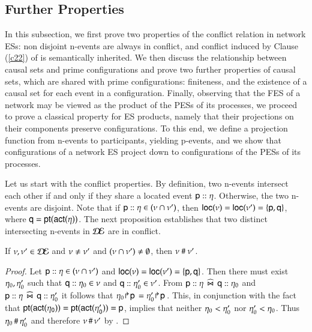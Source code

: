 

\subsection{Further Properties}

In this subsection, we first prove two properties of the
conflict relation in network ESs: non disjoint n-events are always in
conflict, and conflict induced by Clause (\ref{c22}) of
 is semantically inherited.  
 We then discuss the relationship between causal sets and prime
configurations and prove two further properties of causal sets, which
are shared with prime configurations: finiteness, and the existence 
of a causal set for each event in a configuration.
Finally,  observing that the FES of a network may be viewed as the product
of the PESs of its processes, we proceed to prove a classical property
for ES products, namely that their projections on their components
preserve configurations.  To this end, we define a projection function
from n-events to participants, yielding p-events, and we show that
configurations of a network ES project down to configurations of the 
PESs of its processes. 

\bigskip

Let us start with the conflict properties. By definition, two
n-events intersect each other if and only if they share a located
event ${\sf p}:: \eta$. Otherwise, the two n-events are
disjoint. 
 Note that if 
${\sf p}:: \eta\in(\nu\cap\nu')$, then
${\sf loc}(\nu) = {\sf loc}(\nu') = \{{\sf p}, {\sf q}\}$, where ${\sf q} ={\sf pt}(\sf act(\eta))$.
The next proposition establishes that two  distinct  intersecting n-events
in $\mathcal{D\!E}$ are in conflict. 
\begin{proposition}
  If $\nu, \nu' \in  \mathcal{D\!E} $ and $\nu\neq \nu'$ and
  $(\nu\cap\nu') \neq \emptyset$, then $\nu~\#~ \nu'$.
\end{proposition} 
\begin{proof}
  Let  ${\sf p}:: \eta\in(\nu\cap\nu')$ and
  ${\sf loc}(\nu)={\sf loc}(\nu') =\{{\sf p},{\sf q}\}$. 
  Then there must exist $\eta_0, \eta'_0$ such that
  ${\sf q}:: \eta_0\in \nu$ and ${\sf q}:: \eta'_0\in
  \nu'$.   From
  ${\sf p}:: \eta\;\,\widehat\Join\;\, {\sf q}:: \eta_0$ and
  ${\sf p}:: \eta\;\,\widehat\Join\;\, {\sf q}:: \eta'_0$ it follows that
  $\eta_0 \! \Rsh \! {\sf p}\, = \eta'_0 \! \Rsh \! {\sf p}\,$. This, in conjunction
  with the fact that ${\sf pt}(\sf act(\eta_0)) =
  {\sf pt}(\sf act(\eta'_0)) = {\sf p}$, implies that  
  neither $\eta_0 < \eta'_0$ nor $\eta'_0 < \eta_0$.
  Thus $\eta_0 \,\#\, \eta'_0$ and therefore $\nu \,\#\, \nu'$
  by .
\end{proof}



